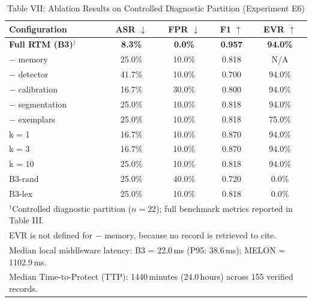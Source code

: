 \begin{table}[t]
\centering
\caption{Table VII: Ablation Results on Controlled Diagnostic Partition (Experiment E6)}
\begin{tabular}{l c c c c}
\hline
\textbf{Configuration} & \textbf{ASR} $\downarrow$ & \textbf{FPR} $\downarrow$ & \textbf{F1} $\uparrow$ & \textbf{EVR} $\uparrow$ \\
\hline
\textbf{Full RTM (B3)}$^\dagger$ & \textbf{8.3\%} & \textbf{0.0\%} & \textbf{0.957} & \textbf{94.0\%} \\
− memory & 25.0\% & 10.0\% & 0.818 & N/A \\
− detector & 41.7\% & 10.0\% & 0.700 & 94.0\% \\
− calibration & 16.7\% & 30.0\% & 0.800 & 94.0\% \\
− segmentation & 25.0\% & 10.0\% & 0.818 & 94.0\% \\
− exemplars & 25.0\% & 10.0\% & 0.818 & 75.0\% \\
k = 1 & 16.7\% & 10.0\% & 0.870 & 94.0\% \\
k = 3 & 16.7\% & 10.0\% & 0.870 & 94.0\% \\
k = 10 & 25.0\% & 10.0\% & 0.818 & 94.0\% \\
B3-rand & 25.0\% & 40.0\% & 0.720 & 0.0\% \\
B3-lex & 25.0\% & 10.0\% & 0.818 & 0.0\% \\
\hline
\multicolumn{5}{l}{\small $^\dagger$Controlled diagnostic partition ($n=22$); full benchmark metrics reported in Table III.} \\
\multicolumn{5}{l}{\small EVR is not defined for $-$ memory, because no record is retrieved to cite.} \\
\multicolumn{5}{l}{\small Median local middleware latency: B3 = 22.0\,ms (P95: 38.6\,ms); MELON = 1102.9\,ms.} \\
\multicolumn{5}{l}{\small Median Time-to-Protect (TTP): 1440\,minutes (24.0\,hours) across 155 verified records.} \\
\hline
\end{tabular}
\end{table}
